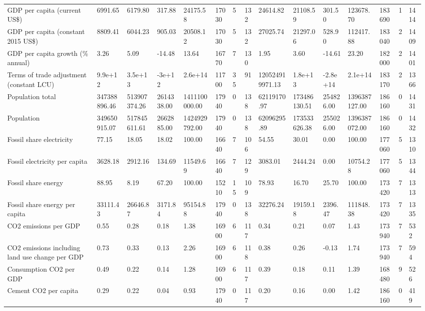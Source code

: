 \begin{longtable}{lllllllllllllll}
GDP per capita (current US\$) & 6991.65 & 6179.80 & 317.88 & 24175.58 & 17030 & 5 & 132 & 24614.82 & 21108.59 & 301.50 & 123678.70 & 183690 & 1 & 1414\\
GDP per capita (constant 2015 US\$) & 8809.41 & 6044.23 & 905.03 & 20508.12 & 17030 & 5 & 132 & 27025.74 & 21297.06 & 528.90 & 112417.88 & 183040 & 2 & 1409\\
GDP per capita growth (\% annual) & 3.26 & 5.09 & -14.48 & 13.64 & 16770 & 7 & 130 & 1.95 & 3.60 & -14.61 & 23.20 & 182000 & 2 & 1401\\
\addlinespace
Terms of trade adjustment (constant LCU) & 9.9e+12 & 3.5e+13 & -3e+12 & 2.6e+14 & 11700 & 35 & 91 & 120524919971.13 & 1.8e+13 & -2.8e+14 & 2.1e+14 & 183170 & 2 & 1366\\
Population total & 347388896.46 & 513907374.26 & 2614338.00 & 1411100000.00 & 17940 & 0 & 138 & 62119170.97 & 173486130.51 & 254826.00 & 1396387127.00 & 186160 & 0 & 1431\\
Population & 349650915.07 & 517845611.61 & 2662885.00 & 1424929792.00 & 17940 & 0 & 138 & 62096295.89 & 173533626.38 & 255026.00 & 1396387072.00 & 186160 & 0 & 1432\\
Fossil share electricity & 77.15 & 18.05 & 18.02 & 100.00 & 16640 & 7 & 106 & 54.55 & 30.01 & 0.00 & 100.00 & 177060 & 5 & 1310\\
Fossil electricity per capita & 3628.18 & 2912.16 & 134.69 & 11549.69 & 16640 & 7 & 129 & 3083.01 & 2444.24 & 0.00 & 10754.28 & 177060 & 5 & 1344\\
\addlinespace
Fossil share energy & 88.95 & 8.19 & 67.20 & 100.00 & 15210 & 15 & 109 & 78.93 & 16.70 & 25.70 & 100.00 & 173420 & 7 & 1313\\
Fossil share energy per capita & 33111.43 & 26646.87 & 3171.84 & 95154.88 & 17940 & 0 & 138 & 32276.24 & 19159.18 & 2396.47 & 111848.38 & 173420 & 7 & 1335\\
CO2 emissions per GDP & 0.55 & 0.28 & 0.18 & 1.38 & 16900 & 6 & 117 & 0.34 & 0.21 & 0.07 & 1.43 & 173940 & 7 & 532\\
CO2 emissions including land use change per GDP & 0.73 & 0.33 & 0.13 & 2.26 & 16900 & 6 & 118 & 0.38 & 0.26 & -0.13 & 1.74 & 173940 & 7 & 594\\
Consumption CO2 per GDP & 0.49 & 0.22 & 0.14 & 1.28 & 16900 & 6 & 117 & 0.39 & 0.18 & 0.11 & 1.39 & 168480 & 9 & 526\\
\addlinespace
Cement CO2 per capita & 0.29 & 0.22 & 0.04 & 0.93 & 17940 & 0 & 117 & 0.20 & 0.16 & 0.00 & 1.42 & 186160 & 0 & 419\\

\end{longtable}
